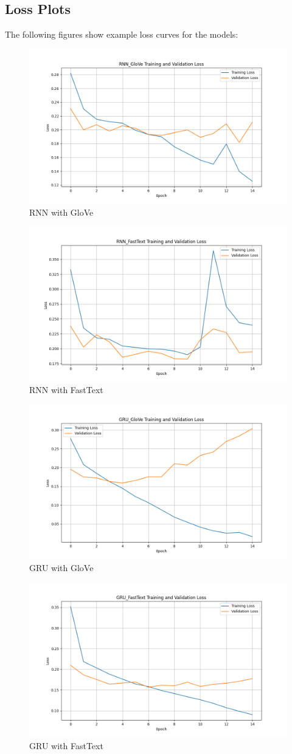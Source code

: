 \documentclass{article}
\begin{document}
\subsection{Loss Plots}
The following figures show example loss curves for the models:
\begin{figure}[H]
    \centering
    \includegraphics[width=0.5\linewidth]{image1.png}
    \caption{RNN with GloVe}
\end{figure}
\begin{figure}[H]
    \centering
    \includegraphics[width=0.5\linewidth]{image2.png}
    \caption{RNN with FastText}
\end{figure}
\begin{figure}[H]
    \centering
    \includegraphics[width=0.5\linewidth]{image3.png}
    \caption{GRU with GloVe}
\end{figure}
\begin{figure}[H]
    \centering
    \includegraphics[width=0.5\linewidth]{image4.png}
    \caption{GRU with FastText}
\end{figure}
\end{document}
